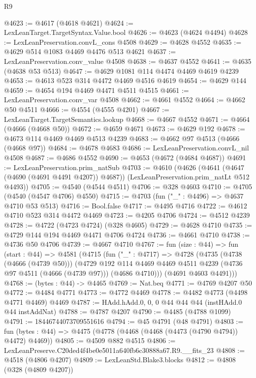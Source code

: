 \begin{lexlean}{R9}
\begin{coremodule}
@4623 := @4617 (@4618 @4621)
@4624 := LexLeanTarget.TargetSyntax.Value.bool
@4626 := @4623 (@4624 @4494)
@4628 := LexLeanPreservation.convL_cons @4508
@4629 := @4628 @4552
@4635 := @4629 @514 @1083 @4469 @4476 @513 @4621
@4637 := LexLeanPreservation.conv_value @4508
@4638 := @4637 @4552
@4641 := @4635 (@4638 @53 @513)
@4647 := @4629 @1081 @114 @4474 @4469 @4619 @4239
@4653 := @4613 @523 @314 @4472 @4469 @4516 @4619
@4654 := @4629 @144
@4659 := @4654 @194 @4469 @4471 @4511 @4515
@4661 := LexLeanPreservation.conv_var @4508
@4662 := @4661 @4552
@4664 := @4662 @50 @4511
@4666 := @4554 (@4555 @4201)
@4667 := LexLeanTarget.TargetSemantics.lookup
@4668 := @4667 @4552
@4671 := @4664 (@4666 (@4668 @50))
@4672 := @4659 @4671
@4673 := @4629 @192
@4678 := @4673 @114 @4469 @4469 @4513 @4239
@4683 := @4662 @97 @4513 (@4666 (@4668 @97))
@4684 := @4678 @4683
@4686 := LexLeanPreservation.convL_nil @4508
@4687 := @4686 @4552
@4690 := @4653 (@4672 (@4684 @4687))
@4691 := LexLeanPreservation.prim_natSub
@4703 := @4610
    (@4626
      (@4641 (@4647 (@4690 (@4691 @4491 @4207)) @4687))
      (LexLeanPreservation.prim_natLt @512 @4493))
@4705 := @4540 (@4544 @4511)
@4706 := @328 @4603
@4710 := @4705 (@4540 (@4547 @4706) @4550)
@4715 := @4703 (fun ("_" : @4496) => @4637 @4710 @53 @513)
@4716 := Bool.false
@4717 := @4495 @4716
@4722 := @4612 @4710 @523 @314 @4472 @4469
@4723 := @4205 @4706
@4724 := @4512 @4239
@4728 := @4722 (@4723 @4724) (@328 @4605)
@4729 := @4628 @4710
@4735 := @4729 @144 @194 @4469 @4471 @4706 @4724
@4736 := @4661 @4710
@4738 := @4736 @50 @4706
@4739 := @4667 @4710
@4767 := fun (size : @44) =>
  fun (start : @44) =>
  @4581
    (@4715
      (fun ("_" : @4717) =>
      @4728
        (@4735
          (@4738 (@4666 (@4739 @50)))
          (@4729
            @192
            @114
            @4469
            @4469
            @4511
            @4239
            (@4736 @97 @4511 (@4666 (@4739 @97)))
            (@4686 @4710)))
        (@4691 @4603 @4491)))
@4768 := (bytes : @44) -> @4465
@4769 := Nat.beq
@4771 := @4769 @4207 @50
@4772 := @4484 @4771
@4773 := @4772 @4469
@4778 := @4482 @4773 (@4498 @4771 @4469) @4469
@4787 := HAdd.hAdd.{0, 0, 0} @44 @44 @44 (instHAdd.{0} @44 instAddNat)
@4788 := @4787 @4207
@4790 := @4485 (@4788 @1099)
@4791 := 18446744073709551616
@4794 := @45 @4791 (@48 @4791)
@4803 := fun (bytes : @44) => @4475 (@4778 (@4468 (@4468 (@4473 (@4790 @4794)) @4472) @4469))
@4805 := @4509 @882 @4515
@4806 := LexLeanPreserve.C20ded4f4be0e5011a640fb6c30888a67.R9.__fits_23
@4808 := @4518 (@4806 @4207)
@4809 := LexLeanStd.Blake3.blocks
@4812 := @4808 (@328 (@4809 @4207))

\end{coremodule}
\end{lexlean}
